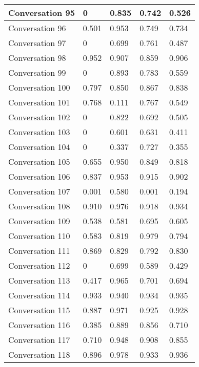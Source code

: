 \begin{table}[]
\begin{tabular}{|l|l|l|l|l|}
Conversation 95  & 0        & 0.835 & 0.742       & 0.526   \\ \hline
Conversation 96  & 0.501    & 0.953 & 0.749       & 0.734   \\ \hline
Conversation 97  & 0        & 0.699 & 0.761       & 0.487   \\ \hline
Conversation 98  & 0.952    & 0.907 & 0.859       & 0.906   \\ \hline
Conversation 99  & 0        & 0.893 & 0.783       & 0.559   \\ \hline
Conversation 100 & 0.797    & 0.850 & 0.867       & 0.838   \\ \hline
Conversation 101 & 0.768    & 0.111 & 0.767       & 0.549   \\ \hline
Conversation 102 & 0        & 0.822 & 0.692       & 0.505   \\ \hline
Conversation 103 & 0        & 0.601 & 0.631       & 0.411   \\ \hline
Conversation 104 & 0        & 0.337 & 0.727       & 0.355   \\ \hline
Conversation 105 & 0.655    & 0.950 & 0.849       & 0.818   \\ \hline
Conversation 106 & 0.837    & 0.953 & 0.915       & 0.902   \\ \hline
Conversation 107 & 0.001    & 0.580 & 0.001       & 0.194   \\ \hline
Conversation 108 & 0.910    & 0.976 & 0.918       & 0.934   \\ \hline
Conversation 109 & 0.538    & 0.581 & 0.695       & 0.605   \\ \hline
Conversation 110 & 0.583    & 0.819 & 0.979       & 0.794   \\ \hline
Conversation 111 & 0.869    & 0.829 & 0.792       & 0.830   \\ \hline
Conversation 112 & 0        & 0.699 & 0.589       & 0.429   \\ \hline
Conversation 113 & 0.417    & 0.965 & 0.701       & 0.694   \\ \hline
Conversation 114 & 0.933    & 0.940 & 0.934       & 0.935   \\ \hline
Conversation 115 & 0.887    & 0.971 & 0.925       & 0.928   \\ \hline
Conversation 116 & 0.385    & 0.889 & 0.856       & 0.710   \\ \hline
Conversation 117 & 0.710    & 0.948 & 0.908       & 0.855   \\ \hline
Conversation 118 & 0.896    & 0.978 & 0.933       & 0.936   \\ \hline

\end{tabular}
\end{table}
